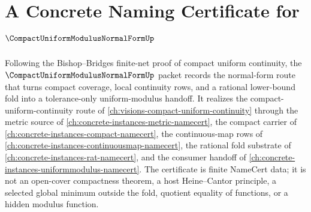 \chapter{A Concrete Naming Certificate for $\CompactUniformModulusNormalFormUp$}
\label{ch:concrete-instances-compact-uniform-modulus-normal-form-namecert}

Following the Bishop--Bridges finite-net proof of compact uniform continuity, the $\CompactUniformModulusNormalFormUp$ packet records the normal-form route that turns compact coverage, local continuity rows, and a rational lower-bound fold into a tolerance-only uniform-modulus handoff. It realizes the compact-uniform-continuity route of \autoref{ch:visions-compact-uniform-continuity} through the metric source of \autoref{ch:concrete-instances-metric-namecert}, the compact carrier of \autoref{ch:concrete-instances-compact-namecert}, the continuous-map rows of \autoref{ch:concrete-instances-continuousmap-namecert}, the rational fold substrate of \autoref{ch:concrete-instances-rat-namecert}, and the consumer handoff of \autoref{ch:concrete-instances-uniformmodulus-namecert}. The certificate is finite NameCert data; it is not an open-cover compactness theorem, a host Heine--Cantor principle, a selected global minimum outside the fold, quotient equality of functions, or a hidden modulus function.

